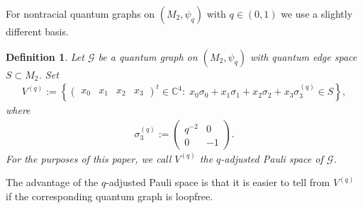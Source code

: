 \documentclass{amsart}
\newtheorem{definition}[thm]{Definition}
\newcommand{\C}{\mathbb{C}}
\begin{document}
For nontracial quantum graphs on $(M_2, \psi_q)$ with $q \in (0,1)$ we use a slightly different basis.

\begin{definition}
    \label{pre::def:q_adjusted_Pauli_space}
    Let $\mathcal{G}$ be a quantum graph on $(M_2, \psi_q)$ with quantum edge space $S \subset M_2$. Set
    \begin{align*}
        V^{(q)} := \left\{\begin{pmatrix}
            x_0 & x_1 & x_2 & x_3
        \end{pmatrix}^t \in \C^4: \; x_0 \sigma_0 + x_1 \sigma_1 +  x_2 \sigma_2 + x_3 \sigma_3^{(q)} \in S \right\},
    \end{align*}
    where
    \begin{align*}
        \sigma_3^{(q)} := \begin{pmatrix}
            q^{-2} & 0 \\
            0 & -1
        \end{pmatrix}.
    \end{align*}
    For the purposes of this paper, we call $V^{(q)}$ the \emph{$q$-adjusted Pauli space} of $\mathcal{G}$.
\end{definition}

The advantage of the $q$-adjusted Pauli space is that it is easier to tell from $V^{(q)}$ if the corresponding quantum graph is loopfree.

\end{document}
